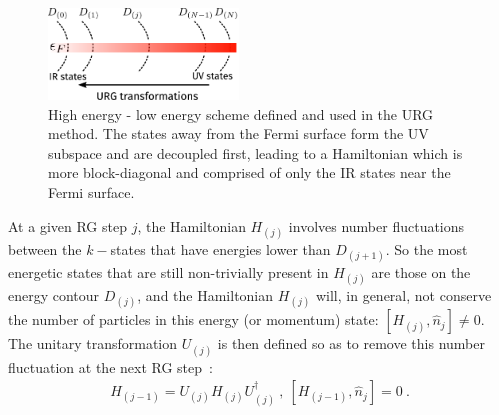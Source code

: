 \documentclass[reprint,superscriptaddress,floatfix]{revtex4-2}
\begin{document}
\begin{figure}[htpb]
	\centering
	\includegraphics[width=0.45\textwidth]{urg-scheme.pdf}
	\caption{High energy - low energy scheme defined and used in the URG method. The states away from the Fermi surface form the UV subspace and are decoupled first, leading to a Hamiltonian which is more block-diagonal and comprised of only the IR states near the Fermi surface.}
	\label{urg-scheme}
\end{figure}

At a given RG step \(j\), the Hamiltonian \(H_{(j)}\) involves number fluctuations between the \(k-\)states that have energies lower than \(D_{(j+1)}\). So the most energetic states that are still non-trivially present in \(H_{(j)}\) are those on the energy contour \(D_{(j)}\), and the Hamiltonian \(H_{(j)}\) will, in general, not conserve the number of particles in this energy (or momentum) state: \(\left[H_{(j)}, \hat n_{j}\right] \neq 0\). The unitary transformation \(U_{(j)}\) is then defined so as to remove this number fluctuation at the next RG step~\cite{anirbanurg1,anirbanurg2}:
\begin{equation}\begin{aligned}
	H_{(j-1)} = U_{(j)} H_{(j)} U^\dagger_{(j)}~, ~\left[H_{(j-1)}, \hat n_{j}\right] =0~.
\end{aligned}\end{equation}
\end{document}
